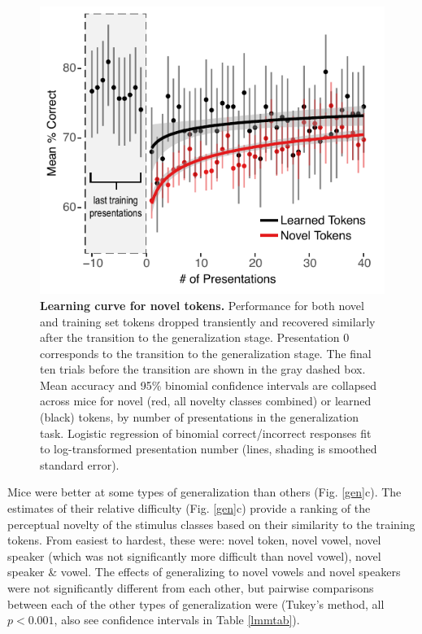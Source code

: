 \begin{figure}[t]
\includegraphics[width=\linewidth]{speech/figures/Figure3.pdf}
\caption{\textbf{Learning curve for novel tokens.} Performance for both novel and training set tokens dropped transiently and recovered similarly after the transition to the generalization stage. Presentation 0 corresponds to the transition to the generalization stage. The final ten trials before the transition are shown in the gray dashed box. Mean accuracy and 95\% binomial confidence intervals are collapsed across mice for novel (red, all novelty classes combined) or learned (black) tokens, by number of presentations in the generalization task. Logistic regression of binomial correct/incorrect responses fit to log-transformed presentation number (lines, shading is smoothed standard error).}
\label{lc}
\end{figure}

Mice were better at some types of generalization than others (Fig. \ref{gen}c). The estimates of their relative difficulty (Fig. \ref{gen}c) provide a ranking of the perceptual novelty of the stimulus classes based on their similarity to the training tokens. From easiest to hardest, these were: novel token, novel vowel, novel speaker (which was not significantly more difficult than novel vowel), novel speaker \& vowel. The effects of generalizing to novel vowels and novel speakers were not significantly different from each other, but pairwise comparisons between each of the other types of generalization were (Tukey's method, all $p < 0.001$, also see confidence intervals in Table \ref{lmmtab}).

